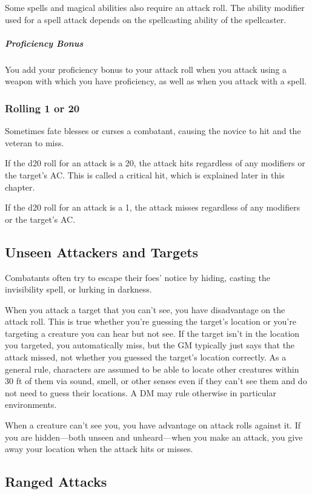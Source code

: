 Some spells and magical abilities also require an attack roll. The ability modifier used for a spell attack depends on the spellcasting ability of the spellcaster.

\subparagraph*{Proficiency Bonus} You add your proficiency bonus to your attack roll when you attack using a weapon with which you have proficiency, as well as when you attack with a spell.

\subsubsection{Rolling 1 or 20}

Sometimes fate blesses or curses a combatant, causing the novice to hit and the veteran to miss.

If the d20 roll for an attack is a 20, the attack hits regardless of any modifiers or the target's AC. This is called a critical hit, which is explained later in this chapter.

If the d20 roll for an attack is a 1, the attack misses regardless of any modifiers or the target's AC.

\subsection{Unseen Attackers and Targets}\label{subsec:unseen-attackers}

Combatants often try to escape their foes' notice by hiding, casting the invisibility spell, or lurking in darkness.

When you attack a target that you can't see, you have disadvantage on the attack roll. This is true whether you're guessing the target's location or you're targeting a creature you can hear but not see. If the target isn't in the location you targeted, you automatically miss, but the GM typically just says that the attack missed, not whether you guessed the target's location correctly. As a general rule, characters are assumed to be able to locate other creatures within 30 ft of them via sound, smell, or other senses even if they can't see them and do not need to guess their locations. A DM may rule otherwise in particular environments.

When a creature can't see you, you have advantage on attack rolls against it. If you are hidden—both unseen and unheard—when you make an attack, you give away your location when the attack hits or misses.

\subsection{Ranged Attacks}

